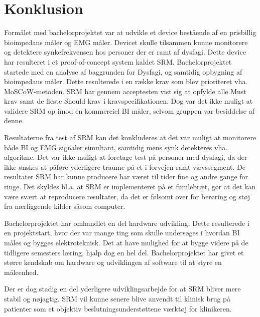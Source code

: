 \chapter{Konklusion}


Formålet med bachelorprojektet var at udvikle et device bestående af en prisbillig bioimpedans måler og EMG måler. Devicet skulle tilsammen kunne monitorere og detektere synkefrekvensen hos personer der er ramt af dysfagi. Dette device har resulteret i et proof-of-concept system kaldet SRM. Bachelorprojektet startede med en analyse af baggrunden for Dysfagi, og samtidig opbygning af bioimpedans måler. Dette resulterede i en række krav som blev prioriteret vha. MoSCoW-metoden. SRM har gennem acceptesten vist sig at opfylde alle Must krav samt de fleste Should krav i kravspecifikationen. Dog var det ikke muligt at validere SRM op imod en kommerciel BI måler, selvom gruppen var besiddelse af denne.

Resultaterne fra test af SRM kan det konkluderes at det var muligt at monitorere både BI og EMG signaler simultant, samtidig mens synk detekteres vha. algoritme. Det var ikke muligt at foretage test på personer med dysfagi, da der ikke ønskes at påføre yderligere traume på et i forvejen ramt vævssegment. De resultater SRM har kunne producere har været til tider fine og andre gange for ringe. Det skyldes bl.a. at SRM er implementeret på et fumlebræt, gør at det kan være svært at reproducere resultater, da det er følsomt over for berøring og støj fra nærliggende kilder såsom computer.


Bachelorprojektet har omhandlet en del hardware udvikling. Dette resulterede i en projektstart, hvor der var mange ting som skulle undersøges i hvordan BI måles og bygges elektroteknisk. Det at have mulighed for at bygge videre på de tidligere semesters læring, hjalp dog en hel del. Bachelorprojektet har givet et større kendskab om hardware og udviklingen af software til at styre en måleenhed. 

Der er dog stadig en del yderligere udviklingsarbejde for at SRM bliver mere stabil og nøjagtig. SRM vil kunne senere blive anvendt til klinisk brug på patienter som et objektiv beslutningsunderstøttene værktøj for klinikeren.












